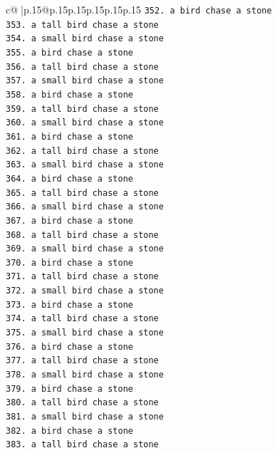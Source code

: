 \documentclass{article}
\begin{document}
{\begin{supertabular}{c@{$\;$}|p{.15\linewidth}@{}p{.15\linewidth}p{.15\linewidth}p{.15\linewidth}p{.15\linewidth}p{.15\linewidth}}
{{{\texttt{352. a bird chase a stone} \\
\texttt{353. a tall bird chase a stone} \\
\texttt{354. a small bird chase a stone} \\
\texttt{355. a bird chase a stone} \\
\texttt{356. a tall bird chase a stone} \\
\texttt{357. a small bird chase a stone} \\
\texttt{358. a bird chase a stone} \\
\texttt{359. a tall bird chase a stone} \\
\texttt{360. a small bird chase a stone} \\
\texttt{361. a bird chase a stone} \\
\texttt{362. a tall bird chase a stone} \\
\texttt{363. a small bird chase a stone} \\
\texttt{364. a bird chase a stone} \\
\texttt{365. a tall bird chase a stone} \\
\texttt{366. a small bird chase a stone} \\
\texttt{367. a bird chase a stone} \\
\texttt{368. a tall bird chase a stone} \\
\texttt{369. a small bird chase a stone} \\
\texttt{370. a bird chase a stone} \\
\texttt{371. a tall bird chase a stone} \\
\texttt{372. a small bird chase a stone} \\
\texttt{373. a bird chase a stone} \\
\texttt{374. a tall bird chase a stone} \\
\texttt{375. a small bird chase a stone} \\
\texttt{376. a bird chase a stone} \\
\texttt{377. a tall bird chase a stone} \\
\texttt{378. a small bird chase a stone} \\
\texttt{379. a bird chase a stone} \\
\texttt{380. a tall bird chase a stone} \\
\texttt{381. a small bird chase a stone} \\
\texttt{382. a bird chase a stone} \\
\texttt{383. a tall bird chase a stone} \\
}}}
\end{supertabular}}
\end{document}
